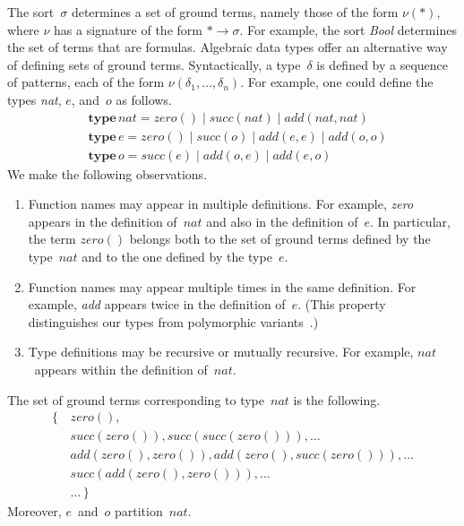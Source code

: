 \documentclass{aamas2012} %
\theoremstyle{remark}
\begin{document}
The sort~$\sigma$ determines a set of ground terms, namely those of the
form $\nu(*)$, where $\nu$ has a signature of the form $*\to\sigma$.  For
example, the sort \textit{Bool} determines the set of terms that are
formulas.  Algebraic data types offer an alternative way of defining sets
of ground terms. Syntactically, a type~$\delta$ is defined by a sequence of
patterns, each of the form $\nu(\delta_1,\ldots,\delta_n)$. For example,
one could define the types \textit{nat}, $e$, and~$o$ as follows.
\begin{align}
&\mathbf{type}\,\mathit{nat} =
      \mathit{zero}()
  \mid\mathit{succ}(\mathit{nat})
  \mid\mathit{add}(\mathit{nat},\mathit{nat}) \\
&\mathbf{type}\,e =
      \mathit{zero}()
  \mid\mathit{succ}(o)
  \mid\mathit{add}(e,e)
  \mid\mathit{add}(o,o) \\
&\mathbf{type}\,o =
      \mathit{succ}(e)
  \mid\mathit{add}(o,e)
  \mid\mathit{add}(e,o)
\end{align}
We make the following observations.
\begin{enumerate}
\item
  Function names may appear in multiple definitions. For example,
  \textit{zero} appears in the definition of~$\mathit{nat}$ and also in the
  definition of~$e$. In particular, the term $\mathit{zero}()$ belongs both
  to the set of ground terms defined by the type~$\mathit{nat}$ and to the
  one defined by the type~$e$.
\item
  Function names may appear multiple times in the same definition. For
  example, \textit{add} appears twice in the definition of~$e$. (This
  property distinguishes our types from polymorphic
  variants~\cite{garrigue1998}.)
\item
  Type definitions may be recursive or mutually recursive. For example,
  $\mathit{nat}$~appears within the definition of~$\mathit{nat}$.
\end{enumerate}
The set of ground terms corresponding to type~$\mathit{nat}$ is the following.
\begin{equation}
\begin{aligned}
\{\,&\mathit{zero}(), \\
    &\mathit{succ}(\mathit{zero}()),
        \mathit{succ}(\mathit{succ}(\mathit{zero}())), \ldots \\
    &\mathit{add}(\mathit{zero}(), \mathit{zero}()),
        \mathit{add}(\mathit{zero}(), \mathit{succ}(\mathit{zero}())),
        \ldots \\
    &\mathit{succ}(\mathit{add}(\mathit{zero}(), \mathit{zero}())),
        \ldots \\
    &\ldots\, \}
\end{aligned}
\end{equation}
Moreover, $e$~and~$o$ partition~$\mathit{nat}$.
\end{document}
